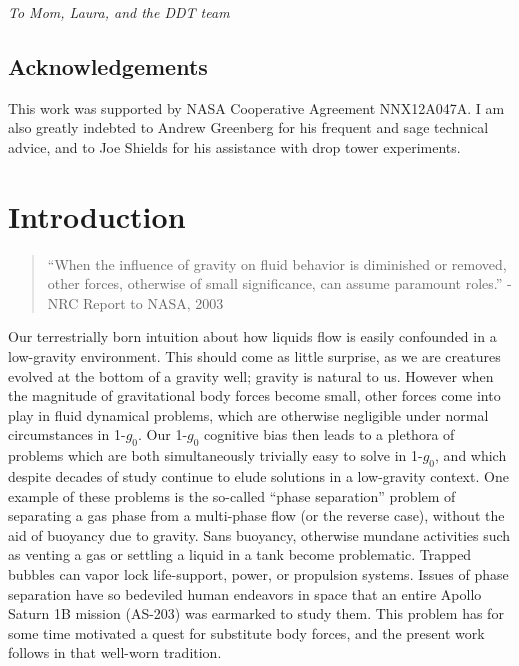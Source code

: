 \documentclass[12pt,a4paper,oneside]{book}
\newcommand\blankpage{%
    \null
    \thispagestyle{empty}%
    \addtocounter{page}{-1}%
    \newpage}
\begin{document}
\emph{To Mom, Laura, and the DDT team}\\
\vspace*{\fill}

\clearpage


\vspace*{\fill}
\section*{Acknowledgements}

This work was supported by NASA Cooperative Agreement NNX12A047A. I am also greatly indebted to Andrew Greenberg for his frequent and sage technical advice, and to Joe Shields for his assistance with drop tower experiments. \\ 
\vspace*{\fill}
\clearpage

\tableofcontents
\afterpage{\blankpage}
\listoffigures
\afterpage{\blankpage}

\mainmatter
\chapter{Introduction}
\begin{quote}
``When the influence of gravity on fluid behavior is diminished or removed, other forces, otherwise of small significance, can assume paramount roles.''
- NRC Report to NASA, 2003\cite{motil_priorities_2012}
\end{quote}

Our terrestrially born intuition about how liquids flow is easily confounded in a low-gravity environment. This should come as little surprise, as we are creatures evolved at the bottom of a gravity well; gravity is natural to us. However when the magnitude of gravitational body forces become small, other forces come into play in fluid dynamical problems, which are otherwise negligible under normal circumstances in 1-$g_0$. Our 1-$g_0$ cognitive bias then leads to a plethora of problems which are both simultaneously trivially easy to solve in 1-$g_0$, and which despite decades of study continue to elude solutions in a low-gravity context. One example of these problems is the so-called ``phase separation'' problem of separating a gas phase from a multi-phase flow (or the reverse case), without the aid of buoyancy due to gravity. Sans buoyancy, otherwise mundane activities such as venting a gas or settling a liquid in a tank become problematic\cite{petrash_controlling_1964}. Trapped bubbles can vapor lock life-support, power, or propulsion systems\cite{jenson_passive_2014}. Issues of phase separation have so bedeviled human endeavors in space that an entire Apollo Saturn 1B mission (AS-203) was earmarked to study them\cite{hastings_saturn_1965}. This problem has for some time motivated a quest for substitute body forces, and the present work follows in that well-worn tradition.
\end{document}
